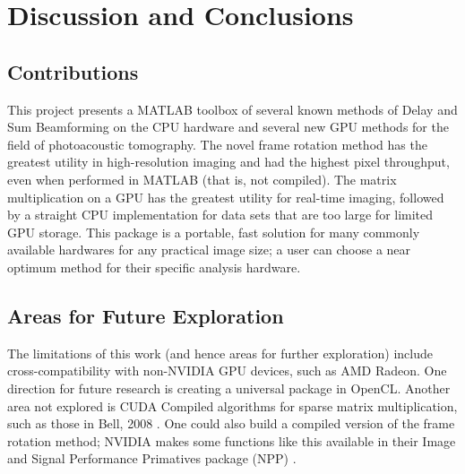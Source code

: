 \chapter{Discussion and Conclusions}
\label{discuss_conclude}

\section{Contributions}
\label{chapter4:contributions}
This project presents a MATLAB toolbox of several known methods of Delay and Sum Beamforming on the CPU hardware and several new GPU methods for the field of photoacoustic tomography. The novel frame rotation method has the greatest utility in high-resolution imaging and had the highest pixel throughput, even when performed in MATLAB (that is, not compiled). The matrix multiplication on a GPU has the greatest utility for real-time imaging, followed by a straight CPU implementation for data sets that are too large for limited GPU storage. This package is a portable, fast solution for many commonly available hardwares for any practical image size; a user can choose a near optimum method for their specific analysis hardware.

\section{Areas for Future Exploration}
\label{chapter4:futurework}
The limitations of this work (and hence areas for further exploration) include cross-compatibility with non-NVIDIA GPU devices, such as AMD Radeon. One direction for future research is creating a universal package in OpenCL. Another area not explored is CUDA Compiled algorithms for sparse matrix multiplication, such as those in Bell, 2008 \cite{bellEfficientSparseMatrixVector2008}. One could also build a compiled version of the frame rotation method; NVIDIA makes some functions like this available in their Image and Signal Performance Primatives package (NPP) \cite{NVIDIA2DImage}.
